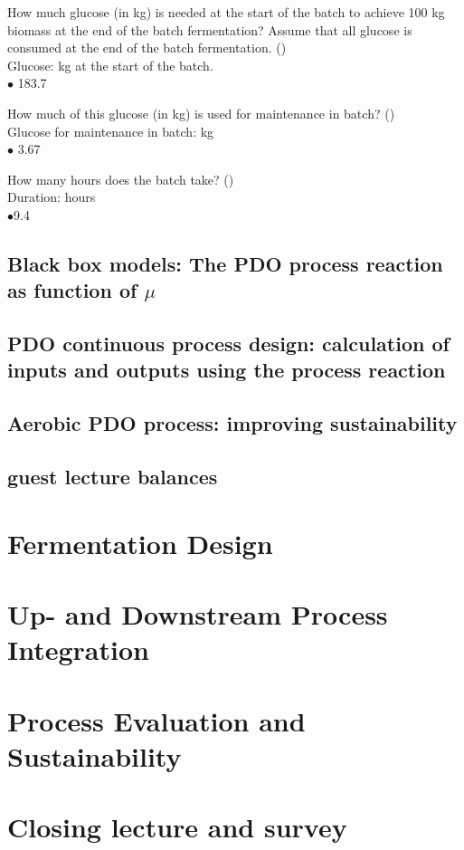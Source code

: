 \documentclass[]{beamer}
\begin{document}
\begin{frame}[shrink] {} 
\color{blue}
    How much glucose (in kg) is needed at the start of the batch to achieve 100 kg biomass at the end of the batch fermentation? Assume that all glucose is consumed at the end of the batch fermentation.  ({\color{green}{Q5b}})\\
\color{black}
\setlength{\parindent}{-0.4cm}
Glucose: \underline{\quad } kg at the start of the batch.\\[0.5em]
{\color{red}$\bullet$} 183.7\\
\end{frame}


\begin{frame}[shrink] {} 
\color{blue}
    How much of this glucose (in kg) is used for maintenance in batch? ({\color{green}{Q5c}})\\
\color{black}
\setlength{\parindent}{-0.4cm}
Glucose for maintenance in batch: \underline{\quad } kg\\[0.5em]
{\color{red}$\bullet$} 3.67\\
\end{frame}


\begin{frame}[shrink] {} 
\color{blue}
    How many hours does the batch take? ({\color{green}{Q5d}})\\
\color{black}
\setlength{\parindent}{-0.4cm}
Duration:\underline{\quad } hours\\[0.5em]
{\color{red}$\bullet$}9.4\\
\end{frame}
\subsection{Black box models: The PDO process reaction as function of $\mu$}
\subsection{PDO continuous process design: calculation of inputs and outputs using the process reaction}
\subsection{Aerobic PDO process: improving sustainability}
\subsection{guest lecture balances}

\section{Fermentation Design}
\section{Up- and Downstream Process Integration}
\section{Process Evaluation and Sustainability}
\section{Closing lecture and survey}
\end{document}
